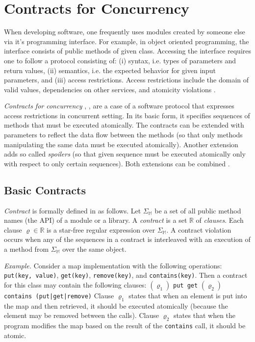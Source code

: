 \chapter{Contracts for Concurrency}


When developing software, one frequently uses modules created by someone else
via it's programming interface. For example, in object oriented programming, the
interface consists of public methods of given class. Accessing the interface
requires one to follow a protocol consisting of: (i) syntax, i.e. types of
parameters and return values, (ii) semantics, i.e. the expected behavior for
given input parameters, and (iii) access restrictions. Access restrictions
include the domain of valid values, dependencies on other services, and
atomicity violations \cite{FITPUB11510}.

\emph{Contracts for concurrency} \cite{FITPUB10817},
\cite{DBLP:journals/corr/SousaDFL15}, are a case of a software protocol that
expresses access restrictions in concurrent setting. In its basic form, it
specifies sequences of methods that must be executed atomically. The contracts
can be extended with parameters to reflect the data flow between the methods (so
that only methods manipulating the same data must be executed atomically).
Another extension adds so called \emph{spoilers} (so that given sequence must be
executed atomically only with respect to only certain sequences). Both
extensions can be combined \cite{FITPUB11510}.


\section{Basic Contracts}

\emph{Contract} is formally defined in \cite{FITPUB10817} as follows. Let
$\Sigma_\mathbb{M}$ be a set of all public method names (the API) of a module or
a library. A \emph{contract} is a set $\mathbb{R}$ of \emph{clauses}. Each
clause $\varrho \in \mathbb{R}$ is a star-free regular expression over
$\Sigma_\mathbb{M}$. A contract violation occurs when any of the sequences in a
contract is interleaved with an execution of a method from $\Sigma_\mathbb{M}$
over the same object.

\emph{Example.} Consider a map implementation with the following operations:
\texttt{put(key, value)}, \texttt{get(key)}, \texttt{remove(key)}, and
\texttt{contains(key)}. Then a contract for this class may contain the following
clauses:  \newline
    $(\varrho_1)$ \texttt{put get} \newline
    $(\varrho_2)$ \texttt{contains (put|get|remove)} \newline
Clause $\varrho_1$ states that when an element is put into the map and then
retrieved, it should be executed atomically (because the element may be removed
between the calls). Clause $\varrho_2$ states that when the program modifies the
map based on the result of the \texttt{contains} call, it should be atomic.

